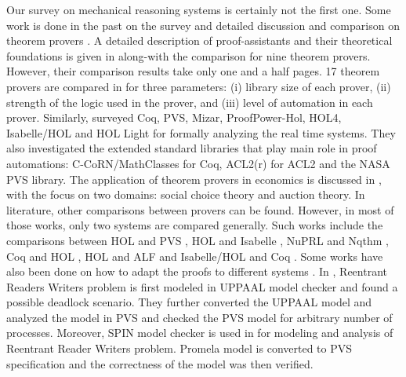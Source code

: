 Our survey on mechanical reasoning systems is certainly not the first one. 
Some work is done in the past on the survey and detailed discussion and comparison on theorem  provers 
. 
A detailed description of proof-assistants and their theoretical foundations is given in  along-with the comparison for nine theorem provers.
However, their comparison results take only one and a half pages. 
17 theorem provers are compared in  for three parameters: (i) library size of each prover, (ii) strength of 
the logic used in the prover, and (iii) level of automation in each prover. 
Similarly,  surveyed Coq, PVS, Mizar, ProofPower-Hol, HOL4, Isabelle/HOL and HOL Light for formally analyzing the  
real time systems. They also investigated the extended standard libraries 
that play main role in proof automations: C-CoRN/MathClasses for Coq, ACL2(r) for ACL2 
and the NASA PVS library. The application of theorem provers in economics is discussed in , with the focus on two domains: 
social choice theory and auction theory. 
In literature, other comparisons between provers can be found. However, in most of those works, only two systems are compared generally. 
Such works include the comparisons between HOL and PVS ,
HOL and Isabelle , NuPRL and Nqthm , Coq and HOL , HOL and ALF  and Isabelle/HOL and Coq . Some works have also been done on how to adapt the proofs to different systems . 
In , Reentrant Readers Writers problem is first modeled in UPPAAL model checker and found a possible
deadlock scenario. They further converted the UPPAAL model and analyzed the model in PVS and checked the PVS model for arbitrary number of 
processes. Moreover, SPIN model checker is used in  for modeling and analysis of 
Reentrant Reader Writers problem.
Promela model is converted to PVS specification and the correctness of the model was then verified.

